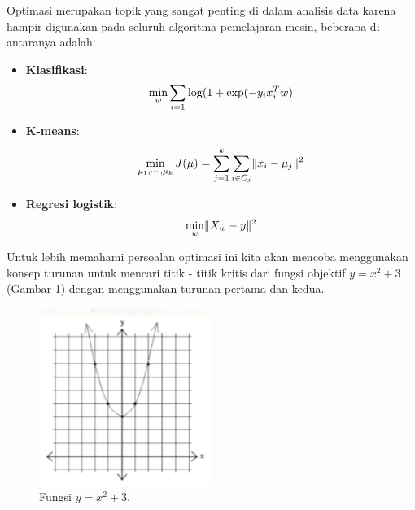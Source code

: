 Optimasi merupakan topik yang sangat penting di dalam analisis data karena hampir digunakan pada seluruh algoritma pemelajaran mesin, beberapa di antaranya adalah:
\begin{itemize}
    \item \textbf{Klasifikasi}:
    \begin{equation}
        \displaystyle{\operatorname*{min}_{w} \sum_{i=1} \log(1 + \exp(-y_{i}x_{i}^{T}w)}
        \label{eqn:eqn36}
    \end{equation}
    \item \textbf{K-means}:
    \begin{equation}
        \displaystyle{\operatorname*{min}_{\mu_{1}, \cdots, \mu_{k}}J(\mu) = \sum_{j=1}^{k}\sum_{i\in C_{j}}\lVert x_{i} - \mu_{j}\rVert^{2}}
        \label{eqn:eqn37}
    \end{equation}
    \item \textbf{Regresi logistik}:
    \begin{equation}
        \displaystyle{\operatorname*{min}_{w} \lVert X_{w} - y \rVert^{2}}
        \label{eqn:eqn38}
    \end{equation}
\end{itemize}

Untuk lebih memahami persoalan optimasi ini kita akan mencoba menggunakan konsep turunan untuk mencari titik - titik kritis dari fungsi objektif $y = x^{2} + 3$ (Gambar \ref{fig:fig10}) dengan menggunakan turunan pertama dan kedua.
\begin{figure}[H]
    \centering
    \includegraphics[width=0.5\textwidth]{gambar/gmb10.png}
    \caption{Fungsi  $y = x^{2} + 3$.}
    \label{fig:fig10}
\end{figure}


